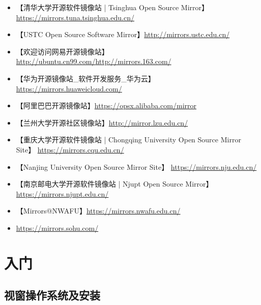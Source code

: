 \documentclass{book}
\begin{document}
\begin{itemize}
	\item 【清华大学开源软件镜像站 | Tsinghua Open Source Mirror】\url{https://mirrors.tuna.tsinghua.edu.cn/}
	\item 【USTC Open Source Software Mirror】\url{http://mirrors.ustc.edu.cn/}
	\item 【欢迎访问网易开源镜像站】\url{http://ubuntu.cn99.com/}\url{http://mirrors.163.com/}
	\item 【华为开源镜像站\_软件开发服务\_华为云】\url{https://mirrors.huaweicloud.com/}
	\item 【阿里巴巴开源镜像站】\url{https://opsx.alibaba.com/mirror}
	\item 【兰州大学开源社区镜像站】\url{http://mirror.lzu.edu.cn/}
	\item 【重庆大学开源软件镜像站 | Chongqing University Open Source Mirror Site】 \url{https://mirrors.cqu.edu.cn/}
	\item 【Nanjing University Open Source Mirror Site】 \url{https://mirrors.nju.edu.cn/}
	\item 【南京邮电大学开源软件镜像站 | Njupt Open Source Mirror】\url{https://mirrors.njupt.edu.cn/}
	\item 【Mirrors@NWAFU】\url{https://mirrors.nwafu.edu.cn/}
	\item \url{https://mirrors.sohu.com/}
\end{itemize}
\mainmatter
\chapter{入门}
\section{视窗操作系统及安装}
\end{document}
